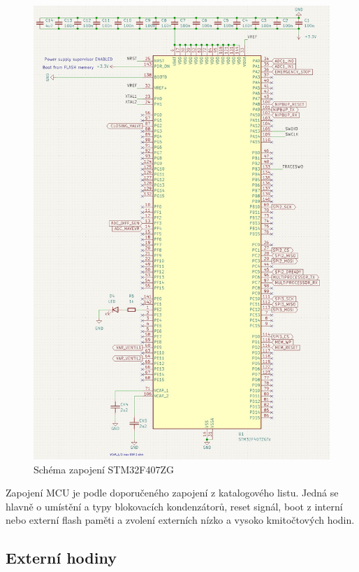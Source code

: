 \begin{figure}[H]
    \centering
    \includegraphics[width=1\linewidth]{pictures/stm_connection.jpg}
    \caption{Schéma zapojení STM32F407ZG}
    \label{fig:stm32_conection}
\end{figure}
\pagebreak
Zapojení MCU je podle doporučeného zapojení z katalogového listu. Jedná se hlavně o umístění a typy blokovacích kondenzátorů, reset signál, boot z interní nebo externí flash paměti a zvolení externích nízko a vysoko kmitočtových hodin. \par

\subsection{Externí hodiny}

